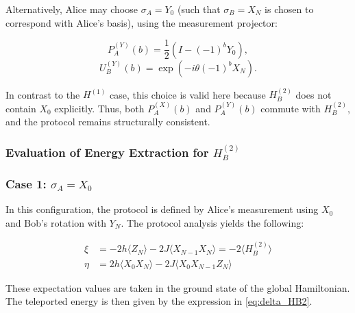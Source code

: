 Alternatively, Alice may choose \( \sigma_A = Y_0 \) (such that \( \sigma_B = X_N \) is chosen to correspond with Alice's basis), using the measurement projector:

\begin{equation}
P_A^{(Y)}(b) = \frac{1}{2} \left( I - (-1)^b Y_0 \right),
\end{equation}
\begin{equation}
U_B^{(Y)}(b) = \exp\left( -i \theta (-1)^b X_N \right).
\end{equation}

In contrast to the \( H^{(1)} \) case, this choice is valid here because \( H_B^{(2)} \) does not contain \( X_0 \) explicitly. Thus, both \( P_A^{(X)}(b) \) and \( P_A^{(Y)}(b) \) commute with \( H_B^{(2)} \), and the protocol remains structurally consistent.

\subsubsection{Evaluation of Energy Extraction for \texorpdfstring{\( H_B^{(2)} \)}{HB2}}

\subsubsection*{Case 1: \texorpdfstring{\( \sigma_A = X_0 \)}{sigmaAX0}}

In this configuration, the protocol is defined by Alice’s measurement using \( X_0 \) and Bob’s rotation with \( Y_N \). The protocol analysis yields the following:

\begin{align}
\label{eq:HB2_xi_eta}
\xi &= -2h \langle Z_N \rangle - 2J \langle X_{N-1} X_N \rangle = -2 \langle H_B^{(2)} \rangle \\
\eta &= 2h \langle X_0 X_N \rangle - 2J \langle X_0 X_{N-1} Z_N \rangle
\end{align}

These expectation values are taken in the ground state of the global Hamiltonian. The teleported energy is then given by the expression in \eqref{eq:delta_HB2}.

